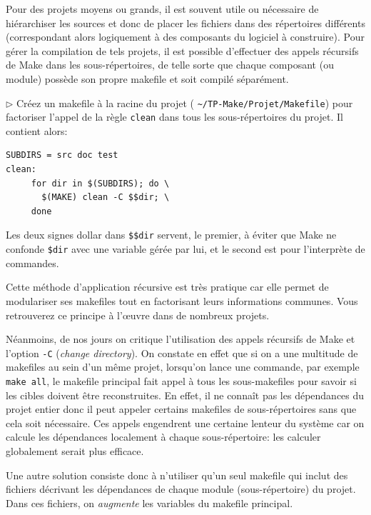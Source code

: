 \documentclass[11pt,a4paper]{article}
\newcommand{\must}{\noindent $\triangleright$ \xspace}
\begin{document}
Pour des projets moyens ou grands, il est souvent utile ou nécessaire
de hiérarchiser les sources et donc de placer les fichiers dans des
répertoires différents (correspondant alors logiquement à des
composants du logiciel à construire). Pour gérer la compilation de
tels projets, il est possible d'effectuer des appels récursifs de
\textsf{Make} dans les sous-répertoires, de telle sorte que chaque
composant (ou module) possède son propre makefile et soit compilé
séparément.

\medskip

\must Créez un makefile à la racine du projet ({\small
\verb!~/TP-Make/Projet/Makefile!}) pour factoriser l'appel de la règle
\texttt{clean} dans tous les sous-répertoires du projet. Il contient
alors:
{\small
\begin{verbatim}
SUBDIRS = src doc test
clean:
     for dir in $(SUBDIRS); do \
       $(MAKE) clean -C $$dir; \
     done
\end{verbatim}
}
\noindent Les deux signes dollar dans {\small \verb!$$dir!} servent,
le premier, à éviter que \textsf{Make} ne confonde {\small
\verb!$dir!} avec une variable gérée par lui, et le second est pour
l'interprète de commandes.

Cette méthode d'application récursive est très pratique car elle
permet de modulariser ses makefiles tout en factorisant leurs
informations communes. Vous retrouverez ce principe à l'{\oe}uvre dans
de nombreux projets.

Néanmoins, de nos jours on critique l'utilisation des appels récursifs
de \textsf{Make} et l'option \texttt{-C} (\emph{change directory}). On
constate en effet que si on a une multitude de makefiles au sein d'un
même projet, lorsqu'on lance une commande, par exemple {\small
\verb!make all!}, le makefile principal fait appel à tous les
sous-makefiles pour savoir si les cibles doivent être
reconstruites. En effet, il ne connaît pas les dépendances du projet
entier donc il peut appeler certains makefiles de sous-répertoires
sans que cela soit nécessaire. Ces appels engendrent une certaine
lenteur du système car on calcule les dépendances localement à chaque
sous-répertoire: les calculer globalement serait plus efficace.

Une autre solution consiste donc à n'utiliser qu'un seul
makefile qui inclut des fichiers décrivant les dépendances de
chaque module (sous-répertoi\-re) du projet. Dans ces fichiers, on
\textit{augmente} les variables du makefile principal.

\medskip
\end{document}
